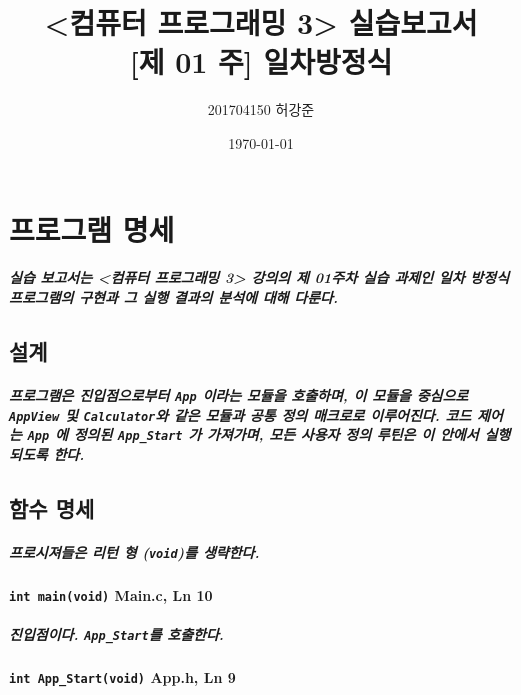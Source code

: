 \documentclass{article}
\begin{document}
    \title{<컴퓨터 프로그래밍 3> 실습보고서 \\ \large [제 01 주] 일차방정식}
    \date{\today}
    \author{201704150 허강준}

    \maketitle

    \newpage

    \tableofcontents

    \newpage

    \section{프로그램 명세}

    \subparagraph{ 실습 보고서는 <컴퓨터 프로그래밍 3> 강의의 제 01주차 실습 과제인 일차 방정식 프로그램의 구현과 그 실행 결과의 분석에 대해 다룬다.}

    \subsection{설계}

    \subparagraph{ 프로그램은 진입점으로부터 \texttt{App} 이라는 모듈을 호출하며, 이 모듈을 중심으로 \texttt{AppView} 및 \texttt{Calculator}와 같은 모듈과 공통 정의 매크로로 이루어진다. 
    코드 제어는 \texttt{App} 에 정의된 \texttt{App\_Start} 가 가져가며, 모든 사용자 정의 루틴은 이 안에서 실행되도록 한다.}

    \subsection{함수 명세}

    \subparagraph{ 프로시져들은 리턴 형 (\texttt{void})를 생략한다.}

    \paragraph{\large\texttt{int main(void)} \tiny Main.c, Ln 10}

    \subparagraph{ 진입점이다. \texttt{App\_Start}를 호출한다.}

    \paragraph{\large\texttt{int App\_Start(void)} \tiny App.h, Ln 9}
\end{document}
